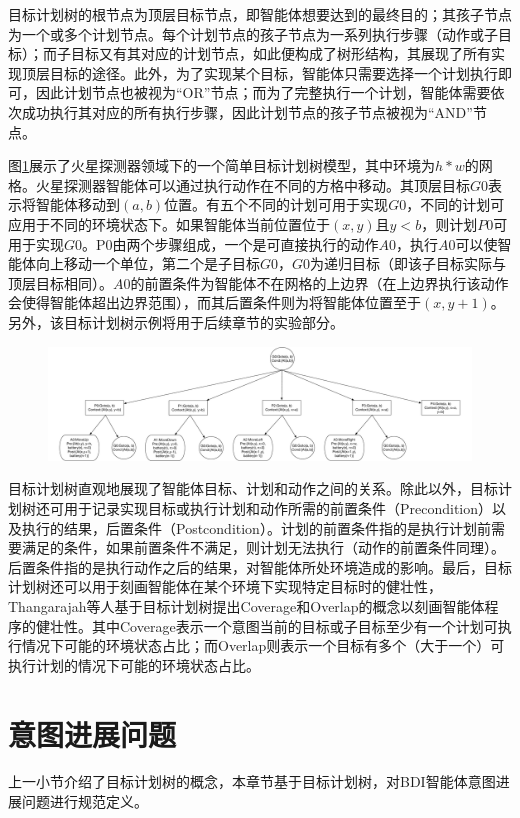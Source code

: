 目标计划树的根节点为顶层目标节点，即智能体想要达到的最终目的；其孩子节点为一个或多个计划节点。每个计划节点的孩子节点为一系列执行步骤（动作或子目标）；而子目标又有其对应的计划节点，如此便构成了树形结构，其展现了所有实现顶层目标的途径。此外，为了实现某个目标，智能体只需要选择一个计划执行即可，因此计划节点也被视为“OR”节点；而为了完整执行一个计划，智能体需要依次成功执行其对应的所有执行步骤，因此计划节点的孩子节点被视为“AND”节点。

图\ref{fig:gpt}展示了火星探测器领域下的一个简单目标计划树模型，其中环境为$h*w$的网格。火星探测器智能体可以通过执行动作在不同的方格中移动。其顶层目标$G0$表示将智能体移动到$(a,b)$位置。有五个不同的计划可用于实现$G0$，不同的计划可应用于不同的环境状态下。如果智能体当前位置位于$(x,y)$且$y < b$，则计划$P0$可用于实现$G0$。P0由两个步骤组成，一个是可直接执行的动作$A0$，执行$A0$可以使智能体向上移动一个单位，第二个是子目标$G0$，$G0$为递归目标（即该子目标实际与顶层目标相同）。$A0$的前置条件为智能体不在网格的上边界（在上边界执行该动作会使得智能体超出边界范围），而其后置条件则为将智能体位置至于$(x,y+1)$。另外，该目标计划树示例将用于后续章节的实验部分。
\begin{figure}[htb]
\centering
\includegraphics[scale=0.23]{./figs/MarsRover_GPT}
\label{fig:gpt}
\end{figure}

目标计划树直观地展现了智能体目标、计划和动作之间的关系。除此以外，目标计划树还可用于记录实现目标或执行计划和动作所需的前置条件（Precondition）以及执行的结果，后置条件（Postcondition）。计划的前置条件指的是执行计划前需要满足的条件，如果前置条件不满足，则计划无法执行（动作的前置条件同理）。后置条件指的是执行动作之后的结果，对智能体所处环境造成的影响。最后，目标计划树还可以用于刻画智能体在某个环境下实现特定目标时的健壮性，Thangarajah等人基于目标计划树提出Coverage和Overlap的概念\cite{DBLP:conf/aamas/ThangarajahSP12}以刻画智能体程序的健壮性。其中Coverage表示一个意图当前的目标或子目标至少有一个计划可执行情况下可能的环境状态占比；而Overlap则表示一个目标有多个（大于一个）可执行计划的情况下可能的环境状态占比。

\section{意图进展问题}
上一小节介绍了目标计划树的概念，本章节基于目标计划树，对BDI智能体意图进展问题进行规范定义。

